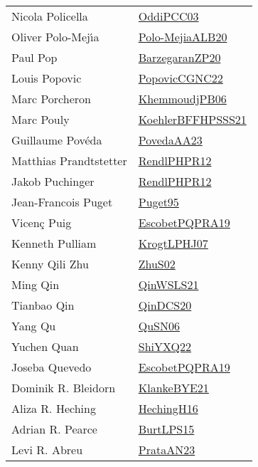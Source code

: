 {\begin{longtable}{p{4cm}p{20cm}}
Nicola Policella & \href{papers/OddiPCC03.pdf}{OddiPCC03}\cite{OddiPCC03} \\
Oliver Polo{-}Mej{\'{\i}}a & \href{}{Polo-MejiaALB20}\cite{Polo-MejiaALB20} \\
Paul Pop & \href{papers/BarzegaranZP20.pdf}{BarzegaranZP20}\cite{BarzegaranZP20} \\
Louis Popovic & \href{papers/PopovicCGNC22.pdf}{PopovicCGNC22}\cite{PopovicCGNC22} \\
Marc Porcheron & \href{papers/KhemmoudjPB06.pdf}{KhemmoudjPB06}\cite{KhemmoudjPB06} \\
Marc Pouly & \href{articles/KoehlerBFFHPSSS21.pdf}{KoehlerBFFHPSSS21}\cite{KoehlerBFFHPSSS21} \\
Guillaume Pov{\'{e}}da & \href{papers/PovedaAA23.pdf}{PovedaAA23}\cite{PovedaAA23} \\
Matthias Prandtstetter & \href{papers/RendlPHPR12.pdf}{RendlPHPR12}\cite{RendlPHPR12} \\
Jakob Puchinger & \href{papers/RendlPHPR12.pdf}{RendlPHPR12}\cite{RendlPHPR12} \\
Jean{-}Francois Puget & \href{papers/Puget95.pdf}{Puget95}\cite{Puget95} \\
Vicen{\c{c}} Puig & \href{articles/EscobetPQPRA19.pdf}{EscobetPQPRA19}\cite{EscobetPQPRA19} \\
Kenneth Pulliam & \href{papers/KrogtLPHJ07.pdf}{KrogtLPHJ07}\cite{KrogtLPHJ07} \\
Kenny Qili Zhu & \href{papers/ZhuS02.pdf}{ZhuS02}\cite{ZhuS02} \\
Ming Qin & \href{articles/QinWSLS21.pdf}{QinWSLS21}\cite{QinWSLS21} \\
Tianbao Qin & \href{articles/QinDCS20.pdf}{QinDCS20}\cite{QinDCS20} \\
Yang Qu & \href{papers/QuSN06.pdf}{QuSN06}\cite{QuSN06} \\
Yuchen Quan & \href{}{ShiYXQ22}\cite{ShiYXQ22} \\
Joseba Quevedo & \href{articles/EscobetPQPRA19.pdf}{EscobetPQPRA19}\cite{EscobetPQPRA19} \\
Dominik R. Bleidorn & \href{papers/KlankeBYE21.pdf}{KlankeBYE21}\cite{KlankeBYE21} \\
Aliza R. Heching & \href{papers/HechingH16.pdf}{HechingH16}\cite{HechingH16} \\
Adrian R. Pearce & \href{papers/BurtLPS15.pdf}{BurtLPS15}\cite{BurtLPS15} \\
Levi R. Abreu & \href{articles/PrataAN23.pdf}{PrataAN23}\cite{PrataAN23} \\

\end{longtable}}
